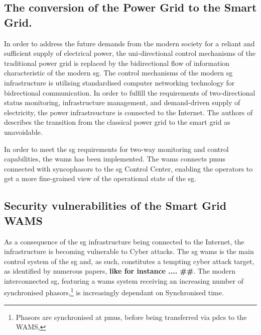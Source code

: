 \subsection{The conversion of the Power Grid to the Smart Grid.}




In order to address the future demands from the modern society for a reliant and sufficient supply of electrical power, the uni-directional control mechanisms of the traditional power grid is replaced by the bidirectional flow of information characteristic of the modern \acrshort{sg}. The control mechanisms of the modern \acrshort{sg} infrastructure is utilising standardised computer networking technology for bidrectional communication.  In order to fulfill the requirements of two-directional status monitoring, infrastructure management, and demand-driven supply of electricity, the power infrastrsucture is connected to the Internet. 
The authors of \cite{colak2020effects}  describes the transition from the classical power grid to the smart grid as unavoidable.


In order to meet the \acrfull{sg} requirements for two-way monitoring  and control capabilities, the \acrfull{wams} has been implemented.
The \acrshort{wams} connects \acrlong{pmu}s connected with syncophasors to the \acrshort{sg} Control Center, enabling the operators to get a more fine-grained view of the operational state of the \acrshort{sg}.







\subsection{Security vulnerabilities of the Smart Grid WAMS}

As a consequence of the \acrshort{sg} infrastructure being connected to the Internet, the infrastructure is becoming vulnerable to Cyber attacks.   The \acrlong{sg} \acrlong{wams} is the main control system of the \acrshort{sg} and, as such, constitutes a tempting cyber attack target, as identified by numerous papers, \textbf{like for instance .... \#\#}. 
The modern interconnected \acrshort{sg}, featuring a \acrshort{wams} system receiving an increasing number of synchronised phasors,\footnote{Phasors are synchronised at \acrshort{pmu}s, before being transferred via \acrshort{pdc}s to the WAMS,}  is increasingly dependant on Synchronised time.

